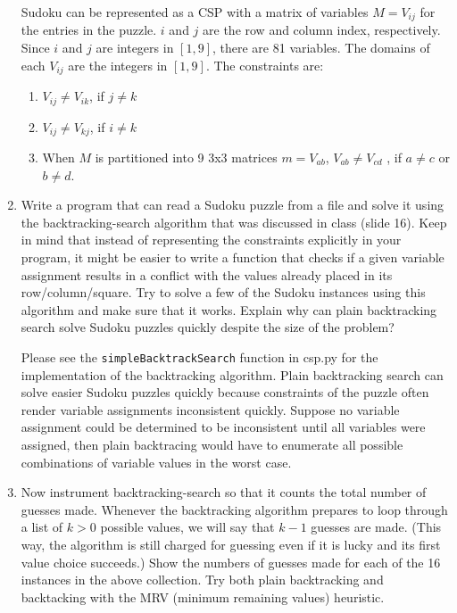 \documentclass[12pt]{article}
\newenvironment{problem}[2][Problem]{\begin{trivlist}
\item[\hskip \labelsep {\bfseries #1}\hskip \labelsep {\bfseries #2.}]}{\end{trivlist}}
\begin{document}
\begin{problem}{2}
\begin{enumerate}
			Sudoku can be represented as a CSP with a matrix of variables $M=V_{ij}$ for the entries in the puzzle.
			$i$ and $j$ are the row and column index, respectively.
			Since $i$ and $j$ are integers in $[1,9]$, there are 81 variables.
			The domains of each $V_{ij}$ are the integers in $[1,9]$.
			The constraints are:
			\begin{enumerate}
				\item $V_{ij} \neq V_{ik}$, if $j \neq k$
				\item $V_{ij} \neq V_{kj}$, if $i \neq k$
				\item When $M$ is partitioned into 9 3x3 matrices $m = V_{ab}$, $V_{ab} \neq V_{cd}$ , if $a \neq c$ or $b \neq d$.
			\end{enumerate}
		\item Write a program that can read a Sudoku puzzle from a file and solve it using the backtracking-search algorithm that was discussed in class (slide 16).
			Keep in mind that instead of representing the constraints explicitly in your program, it might be easier to write a function that checks if a given variable assignment results in a conflict with the values already placed in its row/column/square.
			Try to solve a few of the Sudoku instances using this algorithm and make sure that it works.
			Explain why can plain backtracking search solve Sudoku puzzles quickly despite the size of the problem?

			Please see the \texttt{simpleBacktrackSearch} function in csp.py for the implementation of the backtracking algorithm.
			Plain backtracking search can solve easier Sudoku puzzles quickly because constraints of the puzzle often render variable assignments inconsistent quickly.
			Suppose no variable assignment could be determined to be inconsistent until all variables were assigned, then plain backtracing would have to enumerate all
			possible combinations of variable values in the worst case.
		\item Now instrument backtracking-search so that it counts the total number of guesses made.
			Whenever the backtracking algorithm prepares to loop through a list of $k>0$ possible values, we will say that $k-1$ guesses are made.
			(This way, the algorithm is still charged for guessing even if it is lucky and its first value choice succeeds.)
			Show the numbers of guesses made for each of the 16 instances in the above collection.
			Try both plain backtracking and backtacking with the MRV (minimum remaining values) heuristic.


\end{enumerate}
\end{problem}
\end{document}
